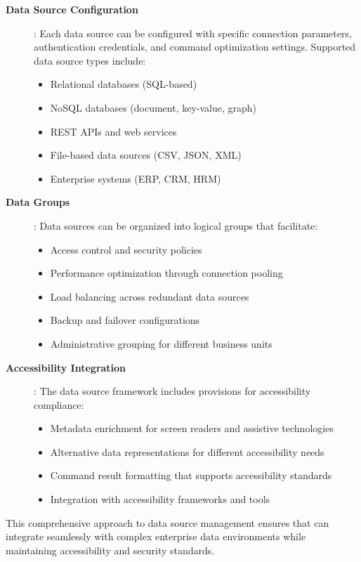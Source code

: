 \begin{description}
\item[\textbf{Data Source Configuration}]: Each data source can be configured with specific connection parameters, authentication credentials, and command optimization settings. Supported data source types include:
\begin{itemize}
\item Relational databases (SQL-based)
\item NoSQL databases (document, key-value, graph)
\item REST APIs and web services
\item File-based data sources (CSV, JSON, XML)
\item Enterprise systems (ERP, CRM, HRM)
\end{itemize}

\item[\textbf{Data Groups}]: Data sources can be organized into logical groups that facilitate:
\begin{itemize}
\item Access control and security policies
\item Performance optimization through connection pooling
\item Load balancing across redundant data sources
\item Backup and failover configurations
\item Administrative grouping for different business units
\end{itemize}

\item[\textbf{Accessibility Integration}]: The data source framework includes provisions for accessibility compliance:
\begin{itemize}
\item Metadata enrichment for screen readers and assistive technologies
\item Alternative data representations for different accessibility needs
\item Command result formatting that supports accessibility standards
\item Integration with accessibility frameworks and tools
\end{itemize}
\end{description}

This comprehensive approach to data source management ensures that \wbdl{} can integrate seamlessly with complex enterprise data environments while maintaining accessibility and security standards.


